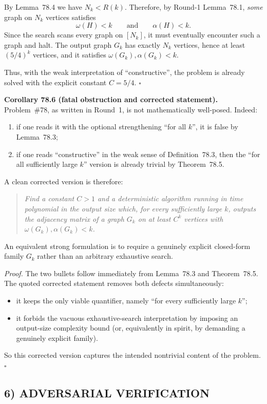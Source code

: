 By Lemma~78.4 we have $N_k<R(k)$.
Therefore, by Round-1 Lemma~78.1, \emph{some} graph on $N_k$ vertices satisfies
\[
\omega(H)<k\qquad\text{and}\qquad \alpha(H)<k.
\]
Since the search scans every graph on $[N_k]$, it must eventually encounter such a graph and halt.
The output graph $G_k$ has exactly $N_k$ vertices, hence at least $(5/4)^k$ vertices, and it satisfies $\omega(G_k),\alpha(G_k)<k$.

Thus, with the weak interpretation of ``constructive'', the problem is already solved with the explicit constant $C=5/4$. \hfill$\square$

\medskip
\noindent\textbf{Corollary 78.6 (fatal obstruction and corrected statement).}
Problem~\#78, as written in Round~1, is not mathematically well-posed.
Indeed:
\begin{enumerate}
\item if one reads it with the optional strengthening ``for all $k$'', it is false by Lemma~78.3;
\item if one reads ``constructive'' in the weak sense of Definition~78.3, then the ``for all sufficiently large $k$'' version is already trivial by Theorem~78.5.
\end{enumerate}
A clean corrected version is therefore:
\begin{quote}
\emph{Find a constant $C>1$ and a deterministic algorithm running in time polynomial in the output size which, for every sufficiently large $k$, outputs the adjacency matrix of a graph $G_k$ on at least $C^k$ vertices with $\omega(G_k),\alpha(G_k)<k$.}
\end{quote}
An equivalent strong formulation is to require a genuinely explicit closed-form family $G_k$ rather than an arbitrary exhaustive search.

\emph{Proof.}
The two bullets follow immediately from Lemma~78.3 and Theorem~78.5.
The quoted corrected statement removes both defects simultaneously:
\begin{itemize}
\item it keeps the only viable quantifier, namely ``for every sufficiently large $k$'';
\item it forbids the vacuous exhaustive-search interpretation by imposing an output-size complexity bound (or, equivalently in spirit, by demanding a genuinely explicit family).
\end{itemize}
So this corrected version captures the intended nontrivial content of the problem. \hfill$\square$

\subsection*{6) ADVERSARIAL VERIFICATION}

